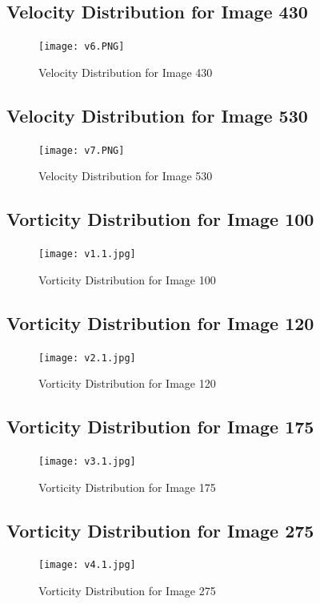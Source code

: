 \documentclass[12pt]{article}
\begin{document}
    \newpage
    \subsection{Velocity Distribution for Image 430}
    \begin{figure}[h]
    \texttt{[image: v6.PNG]}
    \centering
    \caption{Velocity Distribution for Image 430}
    \end{figure}
        
    \newpage
    \subsection{Velocity Distribution for Image 530}
    \begin{figure}[h]
    \texttt{[image: v7.PNG]}
    \centering
    \caption{Velocity Distribution for Image 530}
    \end{figure}
    
    \newpage
    \subsection{Vorticity Distribution for Image 100}
    \begin{figure}[h]
    \texttt{[image: v1.1.jpg]}
    \centering
    \caption{Vorticity Distribution for Image 100}
    \end{figure}
    
    \newpage
    \subsection{Vorticity Distribution for Image 120}
    \begin{figure}[h]
    \texttt{[image: v2.1.jpg]}
    \centering
    \caption{Vorticity Distribution for Image 120}
    \end{figure}
    
    \newpage
    \subsection{Vorticity Distribution for Image 175}
    \begin{figure}[h]
    \texttt{[image: v3.1.jpg]}
    \centering
    \caption{Vorticity Distribution for Image 175}
    \end{figure}
    
    \newpage
    \subsection{Vorticity Distribution for Image 275}
    \begin{figure}[h]
    \texttt{[image: v4.1.jpg]}
    \centering
    \caption{Vorticity Distribution for Image 275}
    \end{figure}
    
\end{document}
